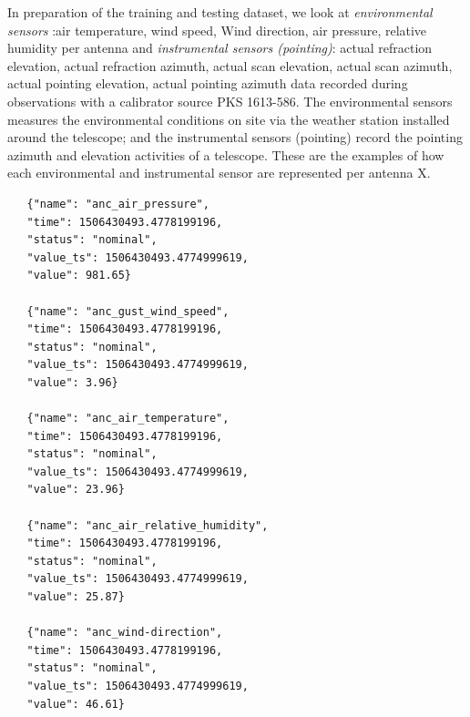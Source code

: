 In preparation of the training and testing dataset, we look at \textit{environmental sensors} :air temperature, wind speed, Wind direction, air pressure, relative humidity per antenna and \textit{instrumental sensors (pointing)}: actual refraction elevation, actual refraction azimuth, actual scan elevation, actual scan azimuth, actual pointing elevation, actual pointing azimuth data recorded during observations with a calibrator source PKS 1613-586. The environmental sensors measures the environmental conditions on site via the weather station installed around the telescope; and the instrumental sensors (pointing) record the pointing azimuth and elevation activities of a telescope. These are the examples of how each environmental and instrumental sensor are represented per antenna X.

 
\begin{tcolorbox}
\begin{lstlisting}
   {"name": "anc_air_pressure",
   "time": 1506430493.4778199196,
   "status": "nominal",
   "value_ts": 1506430493.4774999619,
   "value": 981.65}
   
   {"name": "anc_gust_wind_speed",
   "time": 1506430493.4778199196,
   "status": "nominal",
   "value_ts": 1506430493.4774999619,
   "value": 3.96}

   {"name": "anc_air_temperature",
   "time": 1506430493.4778199196,
   "status": "nominal",
   "value_ts": 1506430493.4774999619,
   "value": 23.96}

   {"name": "anc_air_relative_humidity",
   "time": 1506430493.4778199196,
   "status": "nominal",
   "value_ts": 1506430493.4774999619,
   "value": 25.87}

   {"name": "anc_wind-direction",
   "time": 1506430493.4778199196,
   "status": "nominal",
   "value_ts": 1506430493.4774999619,
   "value": 46.61}
  
\end{lstlisting}
\end{tcolorbox}

